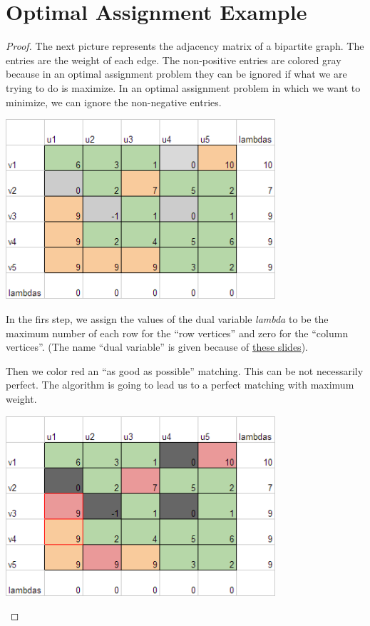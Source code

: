 ﻿\chapter{Optimal Assignment Example}

\begin{proof}
    The next picture represents the adjacency matrix of a bipartite graph.
    The entries are the weight of each edge. The non-positive entries
    are colored gray because in an optimal assignment problem they
    can be ignored if what we are trying to do is maximize. In an optimal
    assignment problem in which we want to minimize, we can ignore the
    non-negative entries.
    
    \begin{center}
        \includegraphics[width=10cm]{OptimalAssignmentExample/OptimalAssignment1.png}    
    \end{center}\pn
    
    In the firs step, we assign the values of the dual variable \textit{lambda} 
    to be the maximum number of each row for the ``row vertices'' and zero
    for the ``column vertices''. (The name ``dual variable'' is given
    because of \href{http://www.mpi-inf.mpg.de/departments/d1/teaching/ss12/AdvancedGraphAlgorithms/Slides06.pdf}{these slides}).\pn
    
    Then we color red an ``as good as possible'' matching. This can be not necessarily perfect.
    The algorithm is going to lead us to a perfect matching with maximum weight.\pn 
    
    \begin{center}
        \includegraphics[width=10cm]{OptimalAssignmentExample/OptimalAssignment2.png}        
    \end{center}\pn
    

\end{proof}
